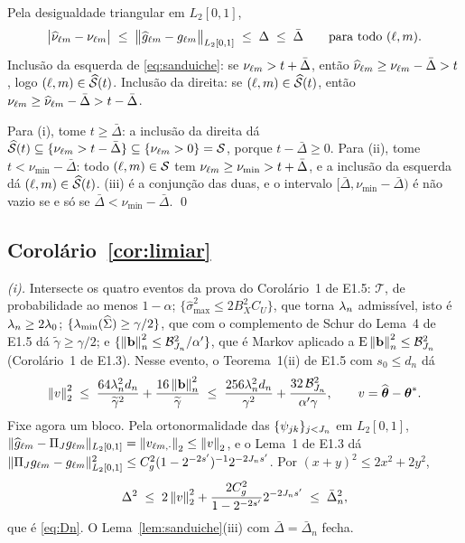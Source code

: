 \documentclass[11pt,a4paper]{article}
\newcommand{\lmin}{\lambda_{\min}}
\newcommand{\bb}{\mathbf{b}}
\newcommand{\gtil}{\widetilde{\gamma}}
\newcommand{\smax}{\widehat{\sigma}_{\max}}
\newcommand{\ghat}[2]{\widehat{g}_{#1#2}}
\newcommand{\Nhat}[2]{\widehat{\nu}_{#1#2}}
\newcommand{\Ntrue}[2]{\nu_{#1#2}}
\newcommand{\Shat}{\widehat{\mathcal{S}}}
\newcommand{\sepmin}{\nu_{\min}}
\begin{document}
Pela desigualdade triangular em $L_{2}[0,1]$,
\begin{equation}
  \label{eq:triangular}
  \bigl|\Nhat{\cv}{\md} - \Ntrue{\cv}{\md}\bigr|
  \;\le\; \bigl\lVert\ghat{\cv}{\md} - \gcomp{\cv}{\md}\bigr\rVert_{L_{2}[0,1]}
  \;\le\; \Delta \;\le\; \bar{\Delta}
  \qquad\text{para todo }(\cv,\md).
\end{equation}
Inclusão da esquerda de \eqref{eq:sanduiche}: se $\Ntrue{\cv}{\md} > t+\bar{\Delta}$,
então $\Nhat{\cv}{\md} \ge \Ntrue{\cv}{\md} - \bar{\Delta} > t$, logo
$(\cv,\md)\in\Shat(t)$. Inclusão da direita: se $(\cv,\md)\in\Shat(t)$, então
$\Ntrue{\cv}{\md} \ge \Nhat{\cv}{\md} - \bar{\Delta} > t - \bar{\Delta}$.

Para (i), tome $t \ge \bar{\Delta}$: a inclusão da direita dá
$\Shat(t) \subseteq \{\Ntrue{\cv}{\md} > t - \bar{\Delta}\} \subseteq
\{\Ntrue{\cv}{\md} > 0\} = \mathcal{S}$, porque $t - \bar{\Delta} \ge 0$. Para (ii), tome
$t < \sepmin - \bar{\Delta}$: todo $(\ell,m)\in \mathcal{S}$ tem
$\Ntrue{\cv}{\md} \ge \sepmin > t + \bar{\Delta}$, e a inclusão da esquerda dá
$(\cv,\md)\in\Shat(t)$. (iii) é a conjunção das duas, e o intervalo
$[\bar{\Delta},\sepmin-\bar{\Delta})$ é não vazio se e só se $\bar{\Delta} < \sepmin - \bar{\Delta}$. \qed

\subsection*{Corolário~\ref{cor:limiar}}

\emph{(i).} Intersecte os quatro eventos da prova do Corolário~1 de E1.5:
$\mathcal{T}$, de probabilidade ao menos $1-\alpha$;
$\{\smax^{2}\le 2B_{X}^{2}C_{U}\}$, que torna $\lambda_{n}$ admissível, isto é
$\lambda_{n}\ge 2\lambda_{0}$; $\{\lmin(\Gramhat)\ge\gamma/2\}$, que com o
complemento de Schur do Lema~4 de E1.5 dá $\gtil \ge \gamma/2$; e
$\{\normn{\bb}^{2} \le \mathcal{B}_{J_{n}}^{2}/\alpha'\}$, que é Markov
aplicado a $\E\normn{\bb}^{2} \le \mathcal{B}_{J_{n}}^{2}$ (Corolário~1 de
E1.3). Nesse evento, o Teorema~1(ii) de E1.5 com $s_{0} \le d_{n}$ dá
\[
  \norm{v}_{2}^{2}
  \;\le\; \frac{64\pen_{n}^{2}d_{n}}{\gtil^{2}} + \frac{16\normn{\bb}^{2}}{\gtil}
  \;\le\; \frac{256\pen_{n}^{2}d_{n}}{\gamma^{2}}
  + \frac{32\,\mathcal{B}_{J_{n}}^{2}}{\alpha'\gamma},
  \qquad v = \thetahat - \thetastar .
\]
Fixe agora um bloco. Pela ortonormalidade das $\{\psi_{jk}\}_{j<J_{n}}$
em $L_{2}[0,1]$,
$\lVert\ghat{\cv}{\md} - \PiJ\gcomp{\cv}{\md}\rVert_{L_{2}[0,1]}
= \norm{v_{\cv\md,\cdot}}_{2} \le \norm{v}_{2}$, e o Lema~1 de E1.3 dá
$\lVert\Pi_{J}g_{\ell m} - g_{\ell m}\rVert^{2}_{L_{2}[0,1]}
\le C_{g}^{2}(1-2^{-2s'})^{-1}2^{-2J_{n}s'}$. Por
$(x+y)^{2}\le 2x^{2}+2y^{2}$,
\[
  \Delta^{2} \;\le\; 2\left\lVert v \right\rVert_{2}^{2}
  + \frac{2C_{g}^{2}}{1-2^{-2s'}}2^{-2J_{n}s'}
  \;\le\; \bar{\Delta}_{n}^{2},
\]
que é \eqref{eq:Dn}. O Lema~\ref{lem:sanduiche}(iii) com $\bar{\Delta} = \bar{\Delta}_{n}$ fecha.
\end{document}
